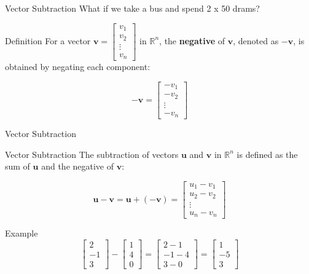 \documentclass{beamer}
\begin{document}
\begin{frame}{Vector Subtraction}
What if we take a bus and spend 2 x 50 drams?
\pause  \begin{block}{Definition}
    For a vector \( \mathbf{v} = \begin{bmatrix} v_1 \\ v_2 \\ \vdots \\ v_n \end{bmatrix} \) in \( \mathbb{R}^n \), the \textbf{negative} of \( \mathbf{v} \), denoted as \( -\mathbf{v} \), is obtained by negating each component:

    \[
    -\mathbf{v} = \begin{bmatrix} -v_1 \\ -v_2 \\ \vdots \\ -v_n \end{bmatrix}
    \]
  \end{block}
\end{frame}

\begin{frame}{Vector Subtraction}


  \begin{block}{Vector Subtraction}
    The subtraction of vectors \( \mathbf{u}  \) and \( \mathbf{v} \) in \( \mathbb{R}^n \) is defined as the sum of \( \mathbf{u} \) and the negative of \( \mathbf{v} \):

    \[
    \mathbf{u} - \mathbf{v} = \mathbf{u} + (-\mathbf{v}) = \begin{bmatrix} u_1 - v_1 \\ u_2 - v_2 \\ \vdots \\ u_n - v_n \end{bmatrix}
    \]
  \end{block}

  \pause\begin{exampleblock}{Example}
    \[
    \begin{bmatrix} 2 \\ -1 \\ 3 \end{bmatrix} - \begin{bmatrix} 1 \\ 4 \\ 0 \end{bmatrix} = \begin{bmatrix} 2 - 1 \\ -1 - 4 \\ 3 - 0 \end{bmatrix} = \begin{bmatrix} 1 \\ -5 \\ 3 \end{bmatrix}
    \]
  \end{exampleblock}
\end{frame}
\end{document}
